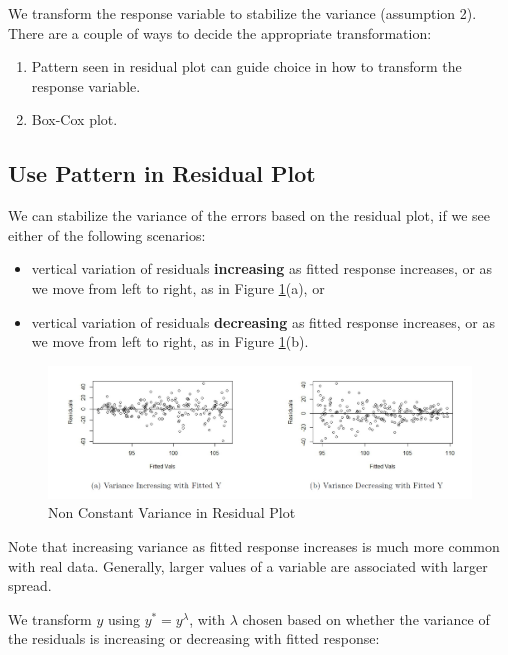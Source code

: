 \documentclass[
]{book}
\providecommand{\tightlist}{%
  \setlength{\itemsep}{0pt}\setlength{\parskip}{0pt}}
\begin{document}
We transform the response variable to stabilize the variance (assumption 2). There are a couple of ways to decide the appropriate transformation:

\begin{enumerate}
\def\labelenumi{\arabic{enumi}.}
\tightlist
\item
  Pattern seen in residual plot can guide choice in how to transform the response variable.
\item
  Box-Cox plot.
\end{enumerate}

\hypertarget{use-pattern-in-residual-plot}{%
\subsection{Use Pattern in Residual Plot}\label{use-pattern-in-residual-plot}}

We can stabilize the variance of the errors based on the residual plot, if we see either of the following scenarios:

\begin{itemize}
\tightlist
\item
  vertical variation of residuals \textbf{increasing} as fitted response increases, or as we move from left to right, as in Figure \ref{fig:variance}(a), or
\item
  vertical variation of residuals \textbf{decreasing} as fitted response increases, or as we move from left to right, as in Figure \ref{fig:variance}(b).
\end{itemize}

\begin{figure}
\centering
\includegraphics{images/variance.jpg}
\caption{\label{fig:variance}Non Constant Variance in Residual Plot}
\end{figure}

Note that increasing variance as fitted response increases is much more common with real data. Generally, larger values of a variable are associated with larger spread.

We transform \(y\) using \(y^{*} = y^{\lambda}\), with \(\lambda\) chosen based on whether the variance of the residuals is increasing or decreasing with fitted response:
\end{document}
